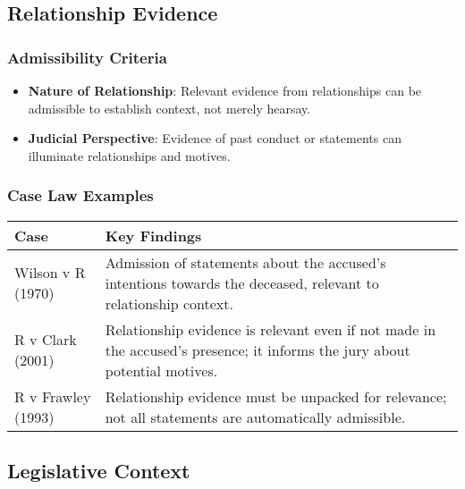\subsection{  Relationship Evidence}\label{relationship-evidence}

\subsubsection{Admissibility Criteria}\label{admissibility-criteria-1}

\begin{itemize}
\tightlist
\item
  \textbf{Nature of Relationship}: Relevant evidence from relationships
  can be admissible to establish context, not merely hearsay.
\item
  \textbf{Judicial Perspective}: Evidence of past conduct or statements
  can illuminate relationships and motives.
\end{itemize}

\subsubsection{Case Law Examples}\label{case-law-examples-1}

\begin{longtable}[]{@{}
  >{\raggedright\arraybackslash}p{}
  >{\raggedright\arraybackslash}p{}@{}}
\toprule\noalign{}
\begin{minipage}[b]{\linewidth}\raggedright
Case
\end{minipage} & \begin{minipage}[b]{\linewidth}\raggedright
Key Findings
\end{minipage} \\
\midrule\noalign{}
\endhead
\bottomrule\noalign{}
\endlastfoot
Wilson v R (1970) & Admission of statements about the accused's
intentions towards the deceased, relevant to relationship context. \\
R v Clark (2001) & Relationship evidence is relevant even if not made in
the accused's presence; it informs the jury about potential motives. \\
R v Frawley (1993) & Relationship evidence must be unpacked for
relevance; not all statements are automatically admissible. \\
\end{longtable}

\subsection{ Legislative Context}\label{legislative-context-1}

